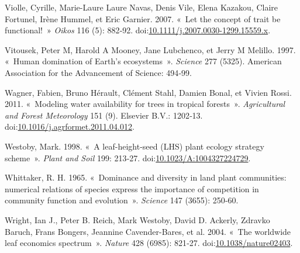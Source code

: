 \documentclass[11pt,french,A4paper,extrafontsizes,onecolumn,openright]{memoir}
\begin{document}
\hypertarget{ref-Violle2007b}{}
Violle, Cyrille, Marie-Laure Laure Navas, Denis Vile, Elena Kazakou,
Claire Fortunel, Irène Hummel, et Eric Garnier. 2007. «~Let the concept
of trait be functional!~» \emph{Oikos} 116 (5): 882‑92.
doi:\href{https://doi.org/10.1111/j.2007.0030-1299.15559.x}{10.1111/j.2007.0030-1299.15559.x}.

\hypertarget{ref-Vitousek1997}{}
Vitousek, Peter M, Harold A Mooney, Jane Lubchenco, et Jerry M Melillo.
1997. «~Human domination of Earth's ecosystems~». \emph{Science} 277
(5325). American Association for the Advancement of Science: 494‑99.

\hypertarget{ref-Wagner2011}{}
Wagner, Fabien, Bruno Hérault, Clément Stahl, Damien Bonal, et Vivien
Rossi. 2011. «~Modeling water availability for trees in tropical
forests~». \emph{Agricultural and Forest Meteorology} 151 (9). Elsevier
B.V.: 1202‑13.
doi:\href{https://doi.org/10.1016/j.agrformet.2011.04.012}{10.1016/j.agrformet.2011.04.012}.

\hypertarget{ref-Westoby1998}{}
Westoby, Mark. 1998. «~A leaf-height-seed (LHS) plant ecology strategy
scheme~». \emph{Plant and Soil} 199: 213‑27.
doi:\href{https://doi.org/10.1023/A:1004327224729}{10.1023/A:1004327224729}.

\hypertarget{ref-Whittaker1965}{}
Whittaker, R. H. 1965. «~Dominance and diversity in land plant
communities: numerical relations of species express the importance of
competition in community function and evolution~». \emph{Science} 147
(3655): 250‑60.

\hypertarget{ref-Wright2004}{}
Wright, Ian J., Peter B. Reich, Mark Westoby, David D. Ackerly, Zdravko
Baruch, Frans Bongers, Jeannine Cavender-Bares, et al. 2004. «~The
worldwide leaf economics spectrum~». \emph{Nature} 428 (6985): 821‑27.
doi:\href{https://doi.org/10.1038/nature02403}{10.1038/nature02403}.
\end{document}
